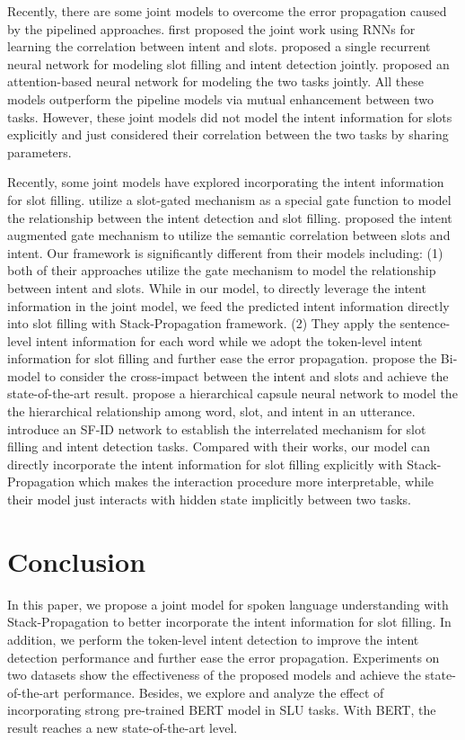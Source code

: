 \documentclass[11pt,a4paper]{article}
\begin{document}
Recently, there are some joint models to overcome the error propagation caused by the pipelined approaches.
first proposed the joint work using RNNs for learning the correlation between intent and slots.  
proposed a single recurrent neural network for modeling slot filling
and intent detection jointly.  
proposed an attention-based neural network
for modeling the two tasks jointly. All these models outperform the pipeline models via mutual enhancement between two tasks. 
However, these joint models
did not model the intent information for slots explicitly and just considered their correlation between the two tasks by sharing parameters.

Recently, some joint models have explored incorporating the intent information for slot filling.
 utilize a slot-gated mechanism as a special gate function to model the relationship between
the intent detection and slot filling.
 proposed the intent augmented gate mechanism to utilize the semantic correlation between slots and intent. 
Our framework is significantly different from their models including: (1)  both of their approaches utilize the gate mechanism to model the relationship
between intent and slots. While in our model, to directly leverage the intent information in the joint model,
we feed the predicted intent information directly into slot filling with Stack-Propagation framework.
(2) They apply the sentence-level intent information for each word while we adopt the token-level intent information for slot filling and further ease the error propagation.
propose the Bi-model to consider the cross-impact between the intent and slots and achieve the state-of-the-art result. 
 propose a hierarchical capsule neural network to model the the hierarchical relationship among word, slot, and intent in an utterance.
 introduce an SF-ID network to establish the interrelated mechanism for slot filling and intent detection tasks.
Compared with their works,  our model can directly incorporate the intent 
information for slot filling explicitly with Stack-Propagation which makes the interaction procedure more interpretable, while their model just interacts with hidden state implicitly between two tasks.

\section{Conclusion}
In this paper, we propose a joint model for spoken language understanding with  
Stack-Propagation to
better incorporate the intent information for slot filling.
In addition, we perform the token-level intent detection to improve the intent detection performance and further ease the error propagation.
Experiments on two datasets show the effectiveness 
of the proposed models and achieve the state-of-the-art 
performance. Besides, we explore and analyze the effect
of incorporating strong pre-trained BERT model in SLU tasks. With BERT, the result reaches a new state-of-the-art level.
\end{document}
